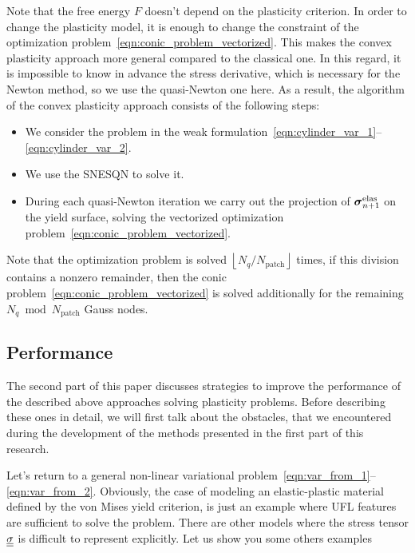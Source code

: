 \documentclass[12pt]{article}
\begin{document}
Note that the free energy $F$ doesn't depend on the plasticity criterion. In order to change the plasticity model, it is enough to change the constraint of the optimization problem~\eqref{eqn:conic_problem_vectorized}. This makes the convex plasticity approach more general compared to the classical one. In this regard, it is impossible to know in advance the stress derivative, which is necessary for the Newton method, so we use the quasi-Newton one here. As a result, the algorithm of the convex plasticity approach consists of the following steps:
\begin{itemize}
    \item We consider the problem in the weak formulation~\eqref{eqn:cylinder_var_1}--\eqref{eqn:cylinder_var_2}.
    \item We use the SNESQN  to solve it.
    \item During each quasi-Newton iteration we carry out the projection of $\mbox{\boldmath$\sigma$}^\text{elas}_{n+1}$ on the yield surface, solving the vectorized optimization problem~\eqref{eqn:conic_problem_vectorized}.
\end{itemize}
Note that the optimization problem is solved $\left\lfloor N_q / N_\text{patch}\right\rfloor$ times, if this division contains a nonzero remainder, then the conic problem~\eqref{eqn:conic_problem_vectorized} is solved additionally for the remaining $N_q \bmod N_\text{patch}$ Gauss nodes. 

\subsection{Performance}
\label{sec:performance}

The second part of this paper discusses strategies to improve the performance of the described above approaches solving plasticity problems. Before describing these ones in detail, we will first talk about the obstacles, that we encountered during the development of the methods presented in the first part of this research. 


Let's return to a general non-linear variational problem~\eqref{eqn:var_from_1}--\eqref{eqn:var_from_2}. Obviously, the case of modeling an elastic-plastic material defined by the von Mises yield criterion, is just an example where UFL features are sufficient to solve the problem. There are other models where the stress tensor $\underline{\underline{\sigma}}$ is difficult to represent explicitly. Let us show you some others examples
\end{document}
